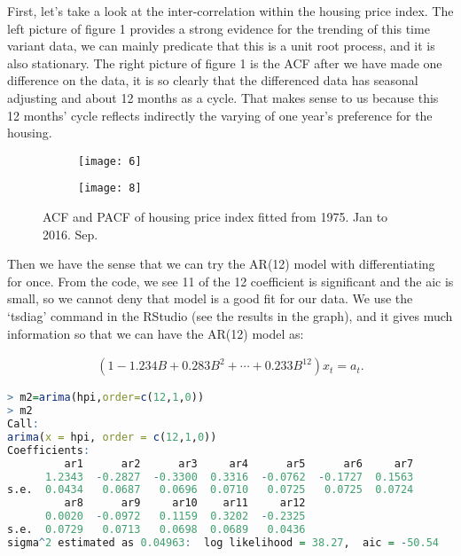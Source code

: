 \documentclass[12pt,letterpaper]{article}
\begin{document}
First, let's take a look at the inter-correlation within the housing price index. 
The left picture of figure 1 provides a strong evidence for the trending of this time variant data, we can mainly predicate that this is a unit root process, and it is also stationary. 
The right picture of figure 1 is the ACF after we have made one difference on the data, it is so clearly that the differenced data has seasonal adjusting and about 12 months as a cycle.
That makes sense to us because this 12 months' cycle reflects indirectly the varying of one year's preference for the housing. 

\begin{figure*}[h!]
\begin{subfigure}[b]{0.4\textwidth}
\begin{center}
 \texttt{[image: 6]}
 \vspace{-0.4cm}
\end{center}
\end{subfigure}
\qquad 
\qquad
\begin{subfigure}[b]{0.4\textwidth}
\begin{center}
 \texttt{[image: 8]}
 \vspace{-0.4cm}
\end{center}
\end{subfigure}
 \vspace{-0.4cm}
 \caption{ ACF and PACF of housing price index fitted from 1975. Jan to 2016. Sep.}
      \label{fig:time}
\vspace{-.25cm}
\end{figure*}

Then we have the sense that we can try the AR(12) model with differentiating for once.
From the code, we see 11 of the 12 coefficient is significant and the aic is small, so we cannot deny that model is a good fit for our data.
We use the `tsdiag' command in the RStudio (see the results in the graph), and it gives much information so that we can have the AR(12) model as: 

 \begin{equation}
\begin{aligned}
(1-1.234B+0.283B^2+ \cdots + 0.233B^{12})x_t=a_t.
\end{aligned}
\end{equation}

{\footnotesize
\begin{lstlisting}[language=R]
> m2=arima(hpi,order=c(12,1,0))  
> m2
Call:
arima(x = hpi, order = c(12,1,0))
Coefficients:
         ar1      ar2      ar3     ar4      ar5      ar6     ar7     
      1.2343  -0.2827  -0.3300  0.3316  -0.0762  -0.1727  0.1563  
s.e.  0.0434   0.0687   0.0696  0.0710   0.0725   0.0725  0.0724  
         ar8      ar9     ar10    ar11     ar12
      0.0020  -0.0972   0.1159  0.3202  -0.2325
s.e.  0.0729   0.0713   0.0698  0.0689   0.0436
sigma^2 estimated as 0.04963:  log likelihood = 38.27,  aic = -50.54
\end{lstlisting}
}
\end{document}
